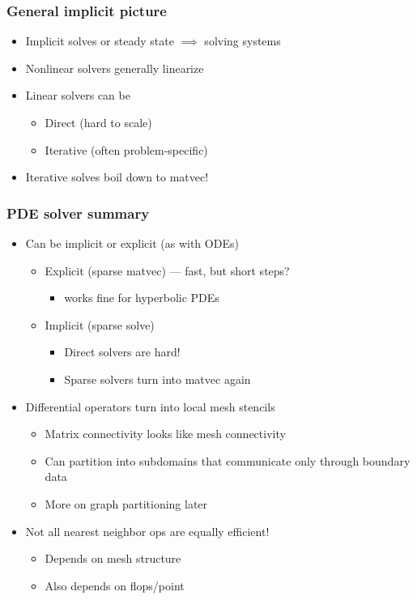 \documentclass{beamer}
\begin{document}
\begin{frame}
  \frametitle{General implicit picture}

  \begin{itemize}
  \item Implicit solves or steady state $\implies$ solving systems
  \item Nonlinear solvers generally linearize
  \item Linear solvers can be
    \begin{itemize}
    \item Direct (hard to scale)
    \item Iterative (often problem-specific)
    \end{itemize}
  \item Iterative solves boil down to matvec!
  \end{itemize}
\end{frame}


\begin{frame}
  \frametitle{PDE solver summary}
  
  \begin{itemize}
  \item Can be implicit or explicit (as with ODEs)
    \begin{itemize}
    \item Explicit (sparse matvec) --- fast, but short steps?
      \begin{itemize}
      \item works fine for hyperbolic PDEs
      \end{itemize}
    \item Implicit (sparse solve)
      \begin{itemize}
      \item Direct solvers are hard!
      \item Sparse solvers turn into matvec again
      \end{itemize}
    \end{itemize}
  \item Differential operators turn into local mesh stencils
    \begin{itemize}
    \item Matrix connectivity looks like mesh connectivity
    \item Can partition into subdomains that communicate only through
      boundary data
    \item More on graph partitioning later
    \end{itemize}
  \item Not all nearest neighbor ops are equally efficient!
    \begin{itemize}
    \item Depends on mesh structure
    \item Also depends on flops/point
    \end{itemize}
  \end{itemize}
\end{frame}
\end{document}

